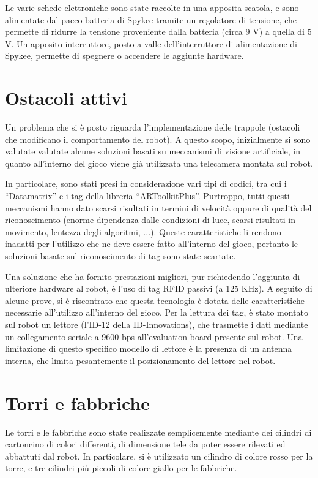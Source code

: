 
Le varie schede elettroniche sono state raccolte in una apposita scatola, e sono alimentate dal pacco batteria di Spykee tramite un regolatore di tensione, che permette di ridurre la tensione proveniente dalla batteria (circa $9$ V) a quella di $5$ V. Un apposito interruttore, posto a valle dell'interruttore di alimentazione di Spykee, permette di spegnere o accendere le aggiunte hardware.

\section{Ostacoli attivi}
Un problema che si è posto riguarda l'implementazione delle trappole (ostacoli che modificano il comportamento del robot). A questo scopo, inizialmente si sono valutate valutate alcune soluzioni basati su meccanismi di visione artificiale, in quanto all'interno del gioco viene già utilizzata una telecamera montata sul robot.

In particolare, sono stati presi in considerazione vari tipi di codici, tra cui i ``Datamatrix'' e i tag della libreria ``ARToolkitPlus''. Purtroppo, tutti questi meccanismi hanno dato scarsi risultati in termini di velocità oppure di qualità del riconoscimento (enorme dipendenza dalle condizioni di luce, scarsi risultati in movimento, lentezza degli algoritmi, ...). Queste caratteristiche li rendono inadatti per l'utilizzo che ne deve essere fatto all'interno del gioco, pertanto le soluzioni basate sul riconoscimento di tag sono state scartate.

Una soluzione che ha fornito prestazioni migliori, pur richiedendo l'aggiunta di ulteriore hardware al robot, è l'uso di tag RFID passivi (a 125 KHz). A seguito di alcune prove, si è riscontrato che questa tecnologia è dotata delle caratteristiche necessarie all'utilizzo all'interno del gioco. Per la lettura dei tag, è stato montato sul robot un lettore (l'ID-12 della ID-Innovations), che trasmette i dati mediante un collegamento seriale a 9600 bps all'evaluation board presente sul robot. Una limitazione di questo specifico modello di lettore è la presenza di un antenna interna, che limita pesantemente il posizionamento del lettore nel robot.

\section{Torri e fabbriche}
Le torri e le fabbriche sono state realizzate semplicemente mediante dei cilindri di cartoncino di colori differenti, di dimensione tele da poter essere rilevati ed abbattuti dal robot. In particolare, si è utilizzato un cilindro di colore rosso per la torre, e tre cilindri più piccoli di colore giallo per le fabbriche. 

